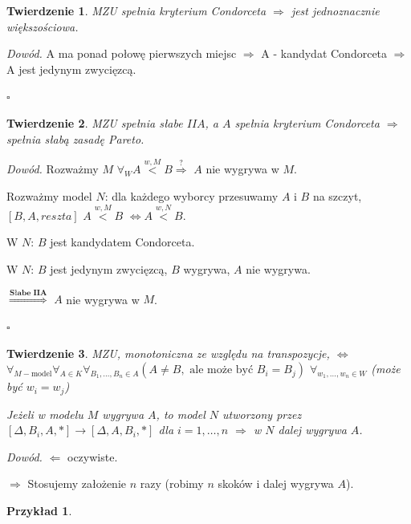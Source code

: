\documentclass[12pt,a4paper]{article}
\theoremstyle{break}
\newtheorem{theorem}{Twierdzenie}[section]
\newtheorem{example}{Przykład}[section]
\newcommand{\witw}{$\Leftrightarrow$}
\begin{document}
		\begin{theorem}
			MZU spełnia kryterium Condorceta $\Rightarrow$ jest jednoznacznie większościowa.
		\end{theorem}
		\textit{Dowód.} A ma ponad połowę pierwszych miejsc $\Rightarrow$ A - kandydat Condorceta $\Rightarrow$ A jest jedynym zwycięzcą.		
		
		\begin{flushright}$\square$\end{flushright}
		
		\begin{theorem}
			MZU spełnia słabe $IIA$, a $A$ spełnia kryterium Condorceta $\Rightarrow$ spełnia słabą zasadę Pareto.
		\end{theorem}
		\textit{Dowód.} Rozważmy $M$ $\forall_{W} A\overset{w,M}{<}B \overset{?}{\Rightarrow}$ $A$ nie wygrywa w $M$.
		
		Rozważmy model $N$: dla każdego wyborcy przesuwamy $A$ i $B$ na szczyt, $[B,A,reszta]$ $A\overset{w,M}{<}B$ \witw $A\overset{w,N}{<}B$.
		
		W $N$: $B$ jest kandydatem Condorceta.
		
		W $N$: $B$ jest jedynym zwycięzcą, $B$ wygrywa, $A$ nie wygrywa. 
		
		$\overset{\textbf{Słabe IIA}}{\Rightarrow}$ $A$ nie wygrywa w $M$.
		\begin{flushright}$\square$\end{flushright}
		
		\begin{theorem}
			MZU, monotoniczna ze względu na transpozycje, \witw $\forall_{M - \text{model}} \forall_{A\in K} \forall_{B_1,\dots,B_n\in A} (A\neq B, \text{ ale może być } B_i=B_j)$
			$\forall_{w_1,\dots,w_n\in W}$ (może być $w_i=w_j$)
			
			Jeżeli w modelu $M$ wygrywa $A$, to model $N$ utworzony przez $[\Delta, B_i, A, *] \rightarrow [\Delta, A, B_i, *]$ dla $i=1,\dots,n$ $\Rightarrow$ w $N$ dalej wygrywa $A$.
			
		\end{theorem}
		
		\textit{Dowód.} $\Leftarrow$ oczywiste.
		
		$\Rightarrow$ Stosujemy założenie $n$ razy (robimy $n$ skoków i dalej wygrywa $A$).
		
		\begin{example}
			
		\end{example}
		
\end{document}
